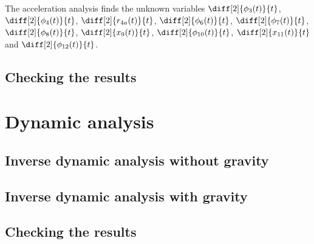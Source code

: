 \documentclass[a4paper]{article}
\begin{document}
The acceleration analysis finds the unknown variables \(\diff[2]{\phi_3(t)}{t}\), \(\diff[2]{\phi_4(t)}{t}\), \(\diff[2]{r_{4a}(t)}{t}\), \(\diff[2]{\phi_6(t)}{t}\), \(\diff[2]{\phi_7(t)}{t}\), \(\diff[2]{\phi_8(t)}{t}\), \(\diff[2]{x_9(t)}{t}\), \(\diff[2]{\phi_{10}(t)}{t}\), \(\diff[2]{x_{11}(t)}{t}\) and \(\diff[2]{\phi_{12}(t)}{t}\).

\subsection{Checking the results}

\section{Dynamic analysis}

\subsection{Inverse dynamic analysis without gravity}

\subsection{Inverse dynamic analysis with gravity}

\subsection{Checking the results}



\end{document}
